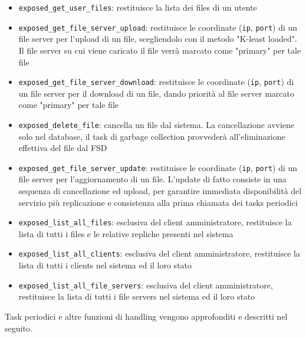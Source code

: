 \documentclass[a4paper, 12pt]{scrreprt}
\begin{document}
            \begin{itemize}

                \item \texttt{exposed\_get\_user\_files}: restituisce la lista dei files di un utente

                \item \texttt{exposed\_get\_file\_server\_upload}: restituisce le coordinate (\texttt{ip}, \texttt{port}) di un file server per l'upload di un file, scegliendolo con il metodo "K-least loaded". Il file server su cui viene caricato il file verrà marcato come "primary" per tale file

                \item \texttt{exposed\_get\_file\_server\_download}: restituisce le coordinate (\texttt{ip}, \texttt{port}) di un file server per il download di un file, dando priorità al file server marcato come "primary" per tale file

                \item \texttt{exposed\_delete\_file}: cancella un file dal sistema. La cancellazione avviene solo nel database, il task di garbage collection provvederà all'eliminazione effettiva del file dal FSD

                \item \texttt{exposed\_get\_file\_server\_update}: restituisce le coordinate (\texttt{ip}, \texttt{port}) di un file server per l'aggiornamento di un file. L'update di fatto consiste in una sequenza di cancellazione ed upload, per garantire immediata disponibilità del servizio più replicazione e consistenza alla prima chiamata dei tasks periodici

                \item \texttt{exposed\_list\_all\_files}: esclusiva del client amministratore, restituisce la lista di tutti i files e le relative repliche presenti nel sistema

                \item \texttt{exposed\_list\_all\_clients}: esclusiva del client amministratore, restituisce la lista di tutti i clients nel sistema ed il loro stato

                \item \texttt{exposed\_list\_all\_file\_servers}: esclusiva del client amministratore, restituisce la lista di tutti i file servers nel sistema ed il loro stato

            \end{itemize}

            Task periodici e altre funzioni di handling vengono approfonditi e descritti nel seguito.
\end{document}
